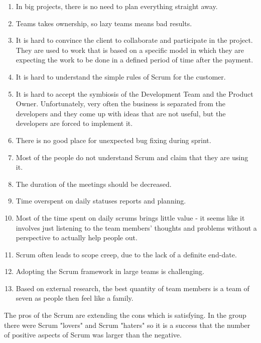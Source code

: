 \begin{enumerate}
    \item In big projects, there is no need to plan everything straight away.
    \item Teams takes ownership, so lazy teams means bad results.
    \item It is hard to convince the client to collaborate and participate in the project. They are used to work  that is based on a specific model in which they are expecting the work to be done in a defined period of time after the payment.
    \item It is hard to understand the simple rules of Scrum for the customer.
    \item It is hard to accept the symbiosis of the Development Team and the Product Owner. Unfortunately, very often the business is separated from the developers and they come up with ideas that are not useful, but the developers are forced to implement it. 
    \item There is no good place for unexpected bug fixing during sprint.
    \item Most of the people do not understand Scrum and claim that they are using it.
    \item The duration of the meetings should be decreased.
    \item Time overspent on daily statuses reports and planning.
    \item Most of the time spent on daily scrums brings little value - it seems like it involves just listening to the team members' thoughts and problems without a perspective to actually help people out.
    \item Scrum often leads to scope creep, due to the lack of a definite end-date.
    \item Adopting the Scrum framework in large teams is challenging.
    \item Based on external research, the best quantity of team members is a team of seven as people then feel like a family.
\end{enumerate}

The pros of the Scrum are extending the cons which is satisfying. In the group there were Scrum "lovers" and Scrum "haters" so it is a success that the number of positive aspects of Scrum was larger than the negative.

